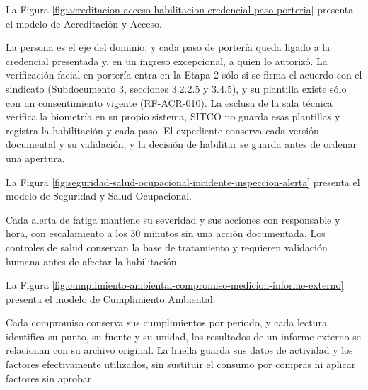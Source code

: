 \documentclass[subdoc]{../../comun/overfore}
\begin{document}
La Figura \ref{fig:acreditacion-acceso-habilitacion-credencial-paso-porteria} presenta el modelo de Acreditación y Acceso.

La persona es el eje del dominio, y cada paso de portería queda ligado a la credencial presentada y, en un ingreso excepcional, a quien lo autorizó. La verificación facial en portería entra en la Etapa 2 sólo si se firma el acuerdo con el sindicato (Subdocumento 3, secciones 3.2.2.5 y 3.4.5), y su plantilla existe sólo con un consentimiento vigente (RF-ACR-010). La esclusa de la sala técnica verifica la biometría en su propio sistema, SITCO no guarda esas plantillas y registra la habilitación y cada paso. El expediente conserva cada versión documental y su validación, y la decisión de habilitar se guarda antes de ordenar una apertura.

La Figura \ref{fig:seguridad-salud-ocupacional-incidente-inspeccion-alerta} presenta el modelo de Seguridad y Salud Ocupacional.

Cada alerta de fatiga mantiene su severidad y sus acciones con responsable y hora, con escalamiento a los 30 minutos sin una acción documentada. Los controles de salud conservan la base de tratamiento y requieren validación humana antes de afectar la habilitación.

La Figura \ref{fig:cumplimiento-ambiental-compromiso-medicion-informe-externo} presenta el modelo de Cumplimiento Ambiental.

Cada compromiso conserva sus cumplimientos por período, y cada lectura identifica su punto, su fuente y su unidad, los resultados de un informe externo se relacionan con su archivo original. La huella guarda sus datos de actividad y los factores efectivamente utilizados, sin sustituir el consumo por compras ni aplicar factores sin aprobar.
\end{document}
